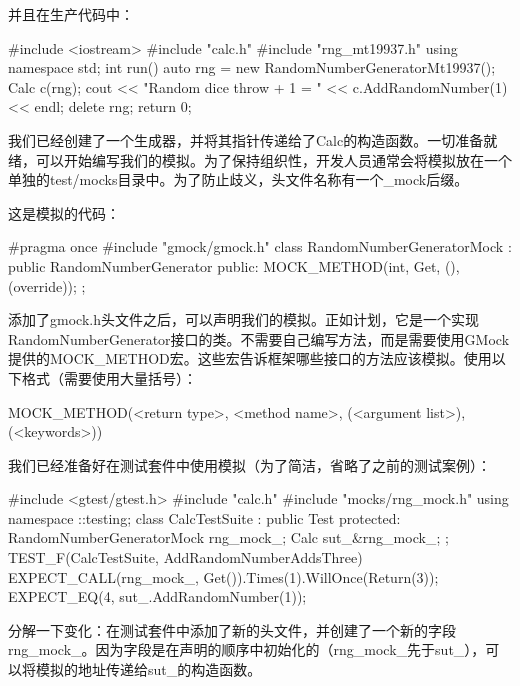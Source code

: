 并且在生产代码中：


\begin{cpp}
#include <iostream>
#include "calc.h"
#include "rng_mt19937.h"
using namespace std;
int run() {
    auto rng = new RandomNumberGeneratorMt19937();
    Calc c(rng);
    cout << "Random dice throw + 1 = "
         << c.AddRandomNumber(1) << endl;
    delete rng;
    return 0;
}
\end{cpp}

我们已经创建了一个生成器，并将其指针传递给了Calc的构造函数。一切准备就绪，可以开始编写我们的模拟。为了保持组织性，开发人员通常会将模拟放在一个单独的test/mocks目录中。为了防止歧义，头文件名称有一个\_mock后缀。

这是模拟的代码：


\begin{cpp}
#pragma once
#include "gmock/gmock.h"
class RandomNumberGeneratorMock : public
RandomNumberGenerator {
public:
    MOCK_METHOD(int, Get, (), (override));
};
\end{cpp}

添加了gmock.h头文件之后，可以声明我们的模拟。正如计划，它是一个实现RandomNumberGenerator接口的类。不需要自己编写方法，而是需要使用GMock提供的MOCK\_METHOD宏。这些宏告诉框架哪些接口的方法应该模拟。使用以下格式（需要使用大量括号）：

\begin{shell}
MOCK_METHOD(<return type>, <method name>,
           (<argument list>), (<keywords>))
\end{shell}

我们已经准备好在测试套件中使用模拟（为了简洁，省略了之前的测试案例）：


\begin{cpp}
#include <gtest/gtest.h>
#include "calc.h"
#include "mocks/rng_mock.h"
using namespace ::testing;
class CalcTestSuite : public Test {
protected:
    RandomNumberGeneratorMock rng_mock_;
    Calc sut_{&rng_mock_};
};
TEST_F(CalcTestSuite, AddRandomNumberAddsThree) {
    EXPECT_CALL(rng_mock_, Get()).Times(1).WillOnce(Return(3));
    EXPECT_EQ(4, sut_.AddRandomNumber(1));
}
\end{cpp}

分解一下变化：在测试套件中添加了新的头文件，并创建了一个新的字段rng\_mock\_。因为字段是在声明的顺序中初始化的（rng\_mock\_先于sut\_），可以将模拟的地址传递给sut\_的构造函数。

